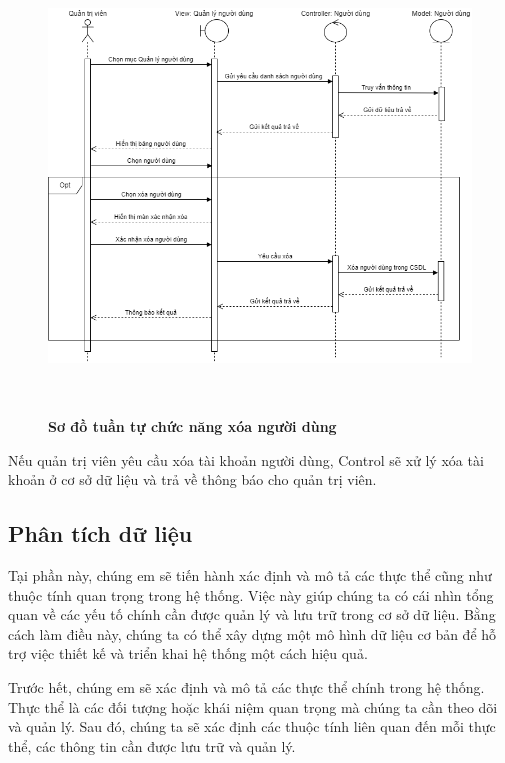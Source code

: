\begin{figure}[H]
  \centering
  \includegraphics[width=14cm,height=12cm]{Images/sequence/sequence_manage_delete_user.png}
  \caption[Sơ đồ tuần tự chức năng xóa người dùng]{\bfseries \fontsize{12pt}{0pt}
  \selectfont Sơ đồ tuần tự chức năng xóa người dùng}
  \label{sequence_manage_delete_user} %
\end{figure}
Nếu quản trị viên yêu cầu xóa tài khoản người dùng, Control sẽ xử lý xóa tài khoản ở cơ sở dữ liệu và trả về thông báo cho quản trị viên.


\subsection{Phân tích dữ liệu}

Tại phần này, chúng em sẽ tiến hành xác định và mô tả các thực thể cũng như
 thuộc tính quan trọng trong hệ thống. Việc này giúp chúng ta có cái
  nhìn tổng quan về các yếu tố chính cần được quản lý và lưu trữ
   trong cơ sở dữ liệu. Bằng cách làm điều này, chúng ta có thể
    xây dựng một mô hình dữ liệu cơ bản để hỗ trợ việc thiết kế và
     triển khai hệ thống một cách hiệu quả.

     Trước hết, chúng em sẽ xác định và mô tả các thực thể chính trong hệ
      thống. Thực thể là các đối tượng hoặc khái niệm quan
       trọng mà chúng ta cần theo dõi và quản lý. Sau đó, chúng ta sẽ xác
        định các thuộc tính liên quan đến mỗi thực thể, các thông tin cần
         được lưu trữ và quản lý.

